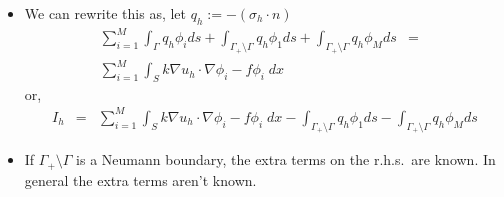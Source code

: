 \documentclass[
  compress
  ,12pt
]{beamer}
\begin{document}
\begin{frame}
      \begin{itemize}
      \item{We can rewrite this as, let $ q_h  := -\left(\sigma_h \cdot n\right)$
	\begin{eqnarray}
	  \nonumber
	  \sum_{i=1}^M \int_{\Gamma} q_h \phi_i ds +
	  \int_{\Gamma_{+} \setminus \Gamma} \!\!\!\!\!\!\! q_h \phi_1 ds +
	  \int_{\Gamma_{+} \setminus \Gamma} \!\!\!\!\!\!\! q_h \phi_M ds 
	  &=&\\
	  \nonumber
	  \sum_{i=1}^M \int_{S} k\nabla u_h \cdot \nabla \phi_i - f\phi_i \;dx 
	\end{eqnarray}
	or,
	\begin{eqnarray}
	  \nonumber
	  I_h  &=&
	  \sum_{i=1}^M \int_{S} k\nabla u_h \cdot \nabla \phi_i - f\phi_i \;dx -
	  \int_{\Gamma_{+} \setminus \Gamma} \!\!\!\!\!\!\! q_h \phi_1 ds -
	  \int_{\Gamma_{+} \setminus \Gamma} \!\!\!\!\!\!\! q_h \phi_M ds 
	\end{eqnarray}
	}

      \item{If $\Gamma_{+} \setminus \Gamma$ is a Neumann boundary, the extra terms on the r.h.s.\
	are known.  In general the extra terms aren't known.}
      \end{itemize}
\end{frame}







	
	







%
\end{document}
